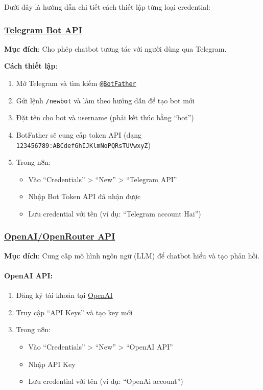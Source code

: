 Dưới đây là hướng dẫn chi tiết cách thiết lập từng loại credential:

\subsubsection{\underline{Telegram Bot API}}
\textbf{Mục đích}: Cho phép chatbot tương tác với người dùng qua Telegram.

\textbf{Cách thiết lập}:
\begin{enumerate}
    \item Mở Telegram và tìm kiếm \texttt{\href{https://telegram.me/BotFather}{@BotFather}}
    \item Gửi lệnh \texttt{/newbot} và làm theo hướng dẫn để tạo bot mới
    \item Đặt tên cho bot và username (phải kết thúc bằng ``bot'')
    \item BotFather sẽ cung cấp token API (dạng \texttt{123456789:ABCdefGhIJKlmNoPQRsTUVwxyZ})
    \item Trong n8n:
    \begin{itemize}
        \item Vào ``Credentials'' > ``New'' > ``Telegram API''
        \item Nhập Bot Token API đã nhận được
        \item Lưu credential với tên (ví dụ: ``Telegram account Hai'')
    \end{itemize}
\end{enumerate}

\subsubsection{\underline{OpenAI/OpenRouter API}}
\textbf{Mục đích}: Cung cấp mô hình ngôn ngữ (LLM) để chatbot hiểu và tạo phản hồi.

\paragraph{OpenAI API:}
\begin{enumerate}
    \item Đăng ký tài khoản tại \href{https://platform.openai.com/}{OpenAI}
    \item Truy cập ``API Keys'' và tạo key mới
    \item Trong n8n:
    \begin{itemize}
        \item Vào ``Credentials'' > ``New'' > ``OpenAI API''
        \item Nhập API Key
        \item Lưu credential với tên (ví dụ: ``OpenAi account'')
    \end{itemize}
\end{enumerate}

